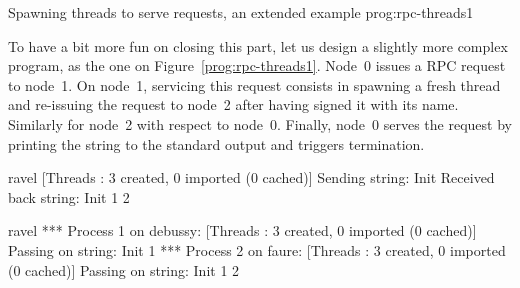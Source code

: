  {Spawning threads to serve
  requests, an extended example} {prog:rpc-threads1}

To have a bit more fun on closing this part, let us design a slightly
more complex program, as the one on Figure~\ref{prog:rpc-threads1}.
Node~0 issues a RPC request to node~1. On node~1, servicing this
request consists in spawning a fresh thread and re-issuing the request
to node~2 after having signed it with its name.  Similarly for node~2
with respect to node~0. Finally, node~0 serves the request by printing
the string to the standard output and triggers termination.
\begin{shell}
ravel%
[Threads : 3 created, 0 imported (0 cached)]
Sending string: Init
Received back string: Init 1 2

ravel%
*** Process 1 on debussy:
[Threads : 3 created, 0 imported (0 cached)]
Passing on string: Init 1
*** Process 2 on faure:
[Threads : 3 created, 0 imported (0 cached)]
Passing on string: Init 1 2
\end{shell}

